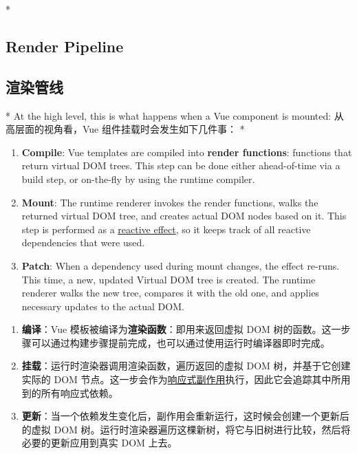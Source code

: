 \begin{paracol}{2} 
 
\switchcolumn[0]*%
\subsection{Render Pipeline}
\switchcolumn
\subsection{渲染管线}
\switchcolumn[0]*%
At the high level, this is what happens when a Vue component is mounted:
\switchcolumn
从高层面的视角看，Vue 组件挂载时会发生如下几件事：
\switchcolumn[0]*%
\begin{enumerate}
\item
  \textbf{Compile}: Vue templates are compiled into \textbf{render
  functions}: functions that return virtual DOM trees. This step can be
  done either ahead-of-time via a build step, or on-the-fly by using the
  runtime compiler.
\item
  \textbf{Mount}: The runtime renderer invokes the render functions,
  walks the returned virtual DOM tree, and creates actual DOM nodes
  based on it. This step is performed as a
  \href{https://vuejs.org/guide/extras/reactivity-in-depth.html}{reactive
  effect}, so it keeps track of all reactive dependencies that were
  used.
\item
  \textbf{Patch}: When a dependency used during mount changes, the
  effect re-runs. This time, a new, updated Virtual DOM tree is created.
  The runtime renderer walks the new tree, compares it with the old one,
  and applies necessary updates to the actual DOM.
\end{enumerate}
\switchcolumn
\begin{enumerate}
\item
  \textbf{编译}：Vue 模板被编译为\textbf{渲染函数}：即用来返回虚拟 DOM
  树的函数。这一步骤可以通过构建步骤提前完成，也可以通过使用运行时编译器即时完成。
\item
  \textbf{挂载}：运行时渲染器调用渲染函数，遍历返回的虚拟 DOM
  树，并基于它创建实际的 DOM
  节点。这一步会作为\href{https://cn.vuejs.org/guide/extras/reactivity-in-depth.html}{响应式副作用}执行，因此它会追踪其中所用到的所有响应式依赖。
\item
  \textbf{更新}：当一个依赖发生变化后，副作用会重新运行，这时候会创建一个更新后的虚拟
  DOM
  树。运行时渲染器遍历这棵新树，将它与旧树进行比较，然后将必要的更新应用到真实
  DOM 上去。
\end{enumerate}
\end{paracol}

